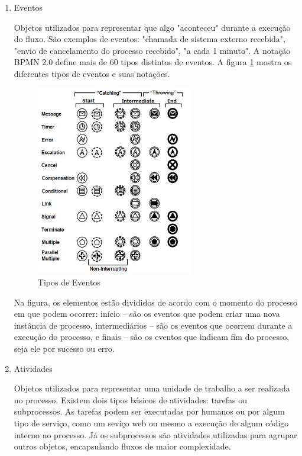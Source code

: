 \begin{enumerate}
    \item Eventos
    
    Objetos utilizados para representar que algo "aconteceu" durante a execução do fluxo. São exemplos de eventos: "chamada de sistema externo recebida", "envio de cancelamento do processo recebido", "a cada 1 minuto". A notação BPMN 2.0 define mais de 60 tipos distintos de eventos. A figura \ref{fig:bpmn_events} mostra os diferentes tipos de eventos e suas notações.
    
    \begin{figure}[H]
    \centering
    \includegraphics[width=0.65\textwidth]{imagens/bpmn_events.jpg}
    \caption{Tipos de Eventos}
    \label{fig:bpmn_events}
    \end{figure}
    
    Na figura, os elementos estão divididos de acordo com o momento do processo em que podem ocorrer: início -- são os eventos que podem criar uma nova instância de processo, intermediários -- são os eventos que ocorrem durante a execução do processo, e finais -- são os eventos que indicam fim do processo, seja ele por sucesso ou erro.
    
    \item Atividades
    
    Objetos utilizados para representar uma unidade de trabalho a ser realizada no processo. Existem dois tipos básicos de atividades: tarefas ou subprocessos. As tarefas podem ser executadas por humanos ou por algum tipo de serviço, como um seviço web ou mesmo a execução de algum código interno no processo. Já os subprocessos são atividades utilizadas para agrupar outros objetos, encapsulando fluxos de maior complexidade.
    

\end{enumerate}
